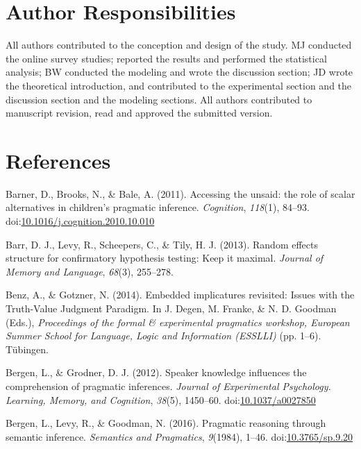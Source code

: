 \documentclass[man]{apa6}
\theoremstyle{definition}
\theoremstyle{definition}
\theoremstyle{definition}
\theoremstyle{remark}
\begin{document}
\section{Author Responsibilities}
All authors contributed to the conception and design of the study. MJ conducted the online survey studies; reported the results and performed the statistical analysis; BW conducted the modeling and wrote the discussion section; JD wrote the theoretical introduction, and contributed to the experimental section and the discussion section and the modeling sections. All authors contributed to manuscript revision, read and approved the submitted version.

\section{References}\label{references}

\setlength{\parindent}{-0.5in} \setlength{\leftskip}{0.5in}

\hypertarget{refs}{}
\hypertarget{ref-Barner2011}{}
Barner, D., Brooks, N., \& Bale, A. (2011). Accessing the unsaid: the
role of scalar alternatives in children's pragmatic inference.
\emph{Cognition}, \emph{118}(1), 84--93.
doi:\href{https://doi.org/10.1016/j.cognition.2010.10.010}{10.1016/j.cognition.2010.10.010}

\hypertarget{ref-barr2013random}{}
Barr, D. J., Levy, R., Scheepers, C., \& Tily, H. J. (2013). Random
effects structure for confirmatory hypothesis testing: Keep it maximal.
\emph{Journal of Memory and Language}, \emph{68}(3), 255--278.

\hypertarget{ref-BenzGotzner2014}{}
Benz, A., \& Gotzner, N. (2014). Embedded implicatures revisited: Issues
with the Truth-Value Judgment Paradigm. In J. Degen, M. Franke, \& N. D.
Goodman (Eds.), \emph{Proceedings of the formal \& experimental
pragmatics workshop, European Summer School for Language, Logic and
Information (ESSLLI)} (pp. 1--6). Tübingen.

\hypertarget{ref-Bergen2012}{}
Bergen, L., \& Grodner, D. J. (2012). Speaker knowledge influences the
comprehension of pragmatic inferences. \emph{Journal of Experimental
Psychology. Learning, Memory, and Cognition}, \emph{38}(5), 1450--60.
doi:\href{https://doi.org/10.1037/a0027850}{10.1037/a0027850}

\hypertarget{ref-Bergen2016}{}
Bergen, L., Levy, R., \& Goodman, N. (2016). Pragmatic reasoning through
semantic inference. \emph{Semantics and Pragmatics}, \emph{9}(1984),
1--46. doi:\href{https://doi.org/10.3765/sp.9.20}{10.3765/sp.9.20}
\end{document}
